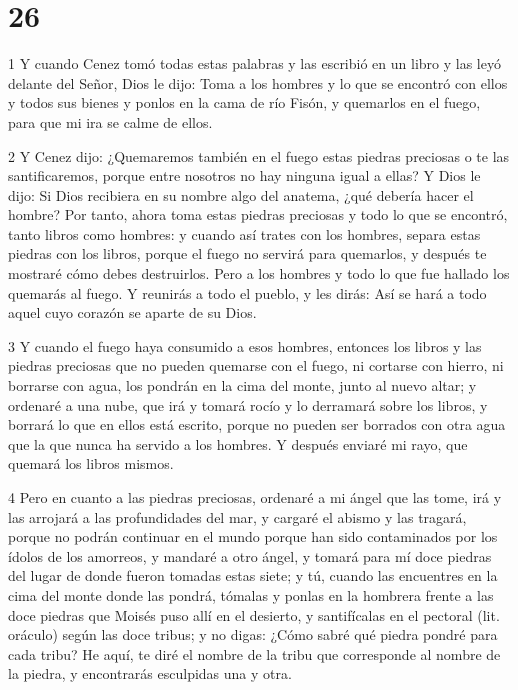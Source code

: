 \chapter{26}

\par 1 Y cuando Cenez tomó todas estas palabras y las escribió en un libro y las leyó delante del Señor, Dios le dijo: Toma a los hombres y lo que se encontró con ellos y todos sus bienes y ponlos en la cama de río Fisón, y quemarlos en el fuego, para que mi ira se calme de ellos.

\par 2 Y Cenez dijo: ¿Quemaremos también en el fuego estas piedras preciosas o te las santificaremos, porque entre nosotros no hay ninguna igual a ellas? Y Dios le dijo: Si Dios recibiera en su nombre algo del anatema, ¿qué debería hacer el hombre? Por tanto, ahora toma estas piedras preciosas y todo lo que se encontró, tanto libros como hombres: y cuando así trates con los hombres, separa estas piedras con los libros, porque el fuego no servirá para quemarlos, y después te mostraré cómo debes destruirlos. Pero a los hombres y todo lo que fue hallado los quemarás al fuego. Y reunirás a todo el pueblo, y les dirás: Así se hará a todo aquel cuyo corazón se aparte de su Dios.

\par 3 Y cuando el fuego haya consumido a esos hombres, entonces los libros y las piedras preciosas que no pueden quemarse con el fuego, ni cortarse con hierro, ni borrarse con agua, los pondrán en la cima del monte, junto al nuevo altar; y ordenaré a una nube, que irá y tomará rocío y lo derramará sobre los libros, y borrará lo que en ellos está escrito, porque no pueden ser borrados con otra agua que la que nunca ha servido a los hombres. Y después enviaré mi rayo, que quemará los libros mismos.

\par 4 Pero en cuanto a las piedras preciosas, ordenaré a mi ángel que las tome, irá y las arrojará a las profundidades del mar, y cargaré el abismo y las tragará, porque no podrán continuar en el mundo porque han sido contaminados por los ídolos de los amorreos, y mandaré a otro ángel, y tomará para mí doce piedras del lugar de donde fueron tomadas estas siete; y tú, cuando las encuentres en la cima del monte donde las pondrá, tómalas y ponlas en la hombrera frente a las doce piedras que Moisés puso allí en el desierto, y santifícalas en el pectoral (lit. oráculo) según las doce tribus; y no digas: ¿Cómo sabré qué piedra pondré para cada tribu? He aquí, te diré el nombre de la tribu que corresponde al nombre de la piedra, y encontrarás esculpidas una y otra.

